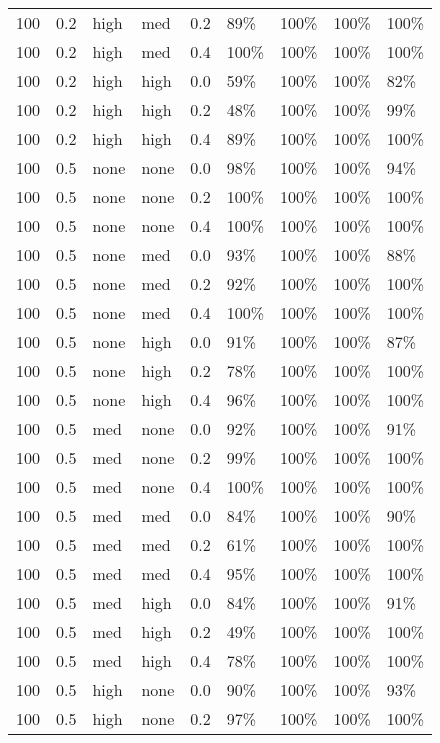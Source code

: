 \begin{longtable}{rrllrllll}
  100 & 0.2 & high & med & 0.2 & 89\% & 100\% & 100\% & 100\% \\ 
  100 & 0.2 & high & med & 0.4 & 100\% & 100\% & 100\% & 100\% \\ 
  100 & 0.2 & high & high & 0.0 & 59\% & 100\% & 100\% & 82\% \\ 
  100 & 0.2 & high & high & 0.2 & 48\% & 100\% & 100\% & 99\% \\ 
  100 & 0.2 & high & high & 0.4 & 89\% & 100\% & 100\% & 100\% \\ 
  100 & 0.5 & none & none & 0.0 & 98\% & 100\% & 100\% & 94\% \\ 
  100 & 0.5 & none & none & 0.2 & 100\% & 100\% & 100\% & 100\% \\ 
  100 & 0.5 & none & none & 0.4 & 100\% & 100\% & 100\% & 100\% \\ 
  100 & 0.5 & none & med & 0.0 & 93\% & 100\% & 100\% & 88\% \\ 
  100 & 0.5 & none & med & 0.2 & 92\% & 100\% & 100\% & 100\% \\ 
  100 & 0.5 & none & med & 0.4 & 100\% & 100\% & 100\% & 100\% \\ 
  100 & 0.5 & none & high & 0.0 & 91\% & 100\% & 100\% & 87\% \\ 
  100 & 0.5 & none & high & 0.2 & 78\% & 100\% & 100\% & 100\% \\ 
  100 & 0.5 & none & high & 0.4 & 96\% & 100\% & 100\% & 100\% \\ 
  100 & 0.5 & med & none & 0.0 & 92\% & 100\% & 100\% & 91\% \\ 
  100 & 0.5 & med & none & 0.2 & 99\% & 100\% & 100\% & 100\% \\ 
  100 & 0.5 & med & none & 0.4 & 100\% & 100\% & 100\% & 100\% \\ 
  100 & 0.5 & med & med & 0.0 & 84\% & 100\% & 100\% & 90\% \\ 
  100 & 0.5 & med & med & 0.2 & 61\% & 100\% & 100\% & 100\% \\ 
  100 & 0.5 & med & med & 0.4 & 95\% & 100\% & 100\% & 100\% \\ 
  100 & 0.5 & med & high & 0.0 & 84\% & 100\% & 100\% & 91\% \\ 
  100 & 0.5 & med & high & 0.2 & 49\% & 100\% & 100\% & 100\% \\ 
  100 & 0.5 & med & high & 0.4 & 78\% & 100\% & 100\% & 100\% \\ 
  100 & 0.5 & high & none & 0.0 & 90\% & 100\% & 100\% & 93\% \\ 
  100 & 0.5 & high & none & 0.2 & 97\% & 100\% & 100\% & 100\% \\ 

\end{longtable}
